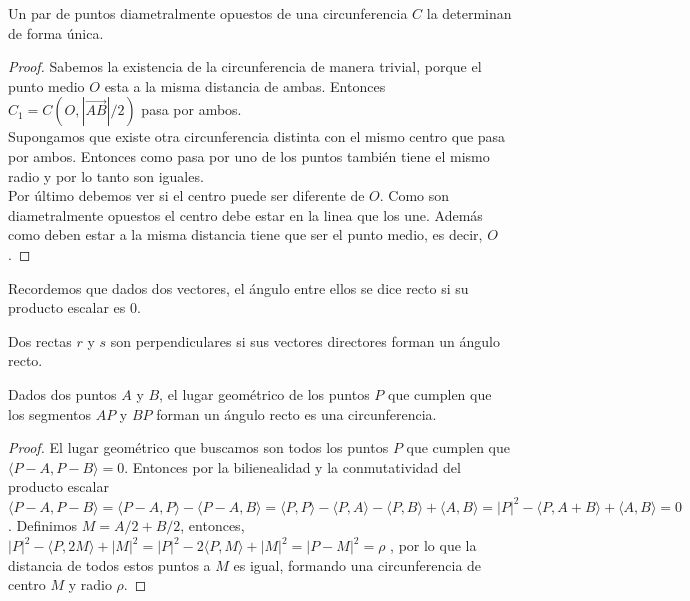 \begin{nprop}
  Un par de puntos diametralmente opuestos de una circunferencia $C$ la determinan de forma única.
\end{nprop}
\begin{proof}
	Sabemos la existencia de la circunferencia de manera trivial, porque el punto medio $O$ esta a la misma distancia de ambas. Entonces $C_1 = C(O, |\vec{AB}|/2)$ pasa por ambos. \\
	Supongamos que existe otra circunferencia  distinta con el mismo centro que pasa por ambos. Entonces como pasa por uno de los puntos también tiene el mismo radio y por lo tanto son iguales.\\
	Por último debemos ver si el centro puede ser diferente de $O$. Como son diametralmente opuestos el centro debe estar en la linea que los une. Además como deben estar a la misma distancia tiene que ser el punto medio, es decir, $O$.
\end{proof}

\begin{nota} Recordemos que dados dos vectores, el ángulo entre ellos se dice recto si su producto escalar es 0.
\end{nota}

\begin{ndef}
  Dos rectas $r$ y $s$ son perpendiculares si sus vectores directores forman un ángulo recto.
\end{ndef}

\begin{nprop}
  Dados dos puntos $A$ y $B$, el lugar geométrico de los puntos $P$ que cumplen que los segmentos $AP$ y $BP$ forman un ángulo recto es una circunferencia.
\end{nprop}

\begin{proof}
	El lugar geométrico que buscamos son todos los puntos $P$ que cumplen que $\langle P-A, P-B\rangle =0$. Entonces por la bilienealidad y la conmutatividad del producto escalar $\langle P-A,P-B\rangle  = \langle P-A,P\rangle  - \langle  P-A,B\rangle  = \langle P,P\rangle  - \langle P,A\rangle  - \langle P,B\rangle  + \langle A,B\rangle  = | P|^2 - \langle P,A+B\rangle  + \langle A,B\rangle  = 0  $. Definimos $M=A/2+B/2 $, entonces, $|P|^2 - \langle P,2M\rangle  + |M|^2 = |P|^2 - 2\langle P,M\rangle  + |M|^2 = |P-M|^2 = \rho$ ,  por lo que la distancia de todos estos puntos a $M$ es igual, formando una circunferencia de centro $M$ y radio $\rho$.
\end{proof}

